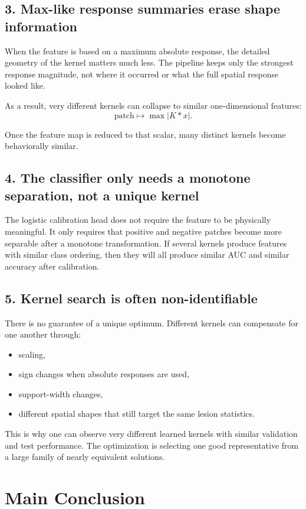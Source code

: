 \documentclass{article}
\begin{document}
\subsection*{3. Max-like response summaries erase shape information}
When the feature is based on a maximum absolute response, the detailed geometry of the kernel matters much less. The pipeline keeps only the strongest response magnitude, not where it occurred or what the full spatial response looked like.

As a result, very different kernels can collapse to similar one-dimensional features:
\[
\text{patch} \longmapsto \max |K * x|.
\]

Once the feature map is reduced to that scalar, many distinct kernels become behaviorally similar.

\subsection*{4. The classifier only needs a monotone separation, not a unique kernel}
The logistic calibration head does not require the feature to be physically meaningful. It only requires that positive and negative patches become more separable after a monotone transformation. If several kernels produce features with similar class ordering, then they will all produce similar AUC and similar accuracy after calibration.

\subsection*{5. Kernel search is often non-identifiable}
There is no guarantee of a unique optimum. Different kernels can compensate for one another through:
\begin{itemize}
    \item scaling,
    \item sign changes when absolute responses are used,
    \item support-width changes,
    \item different spatial shapes that still target the same lesion statistics.
\end{itemize}

This is why one can observe very different learned kernels with similar validation and test performance. The optimization is selecting one good representative from a large family of nearly equivalent solutions.

\section*{Main Conclusion}
\end{document}
